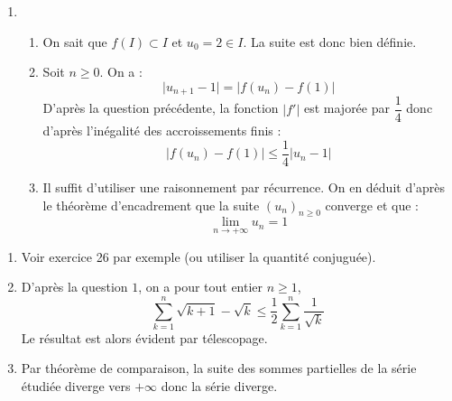 \documentclass[a4paper,twoside,french,11pt]{VcCours}
\begin{document}
\begin{enumerate}
\begin{enumerate}
\end{enumerate}
\item 
\begin{enumerate}
\item On sait que $f(I) \subset I$ et $u_0 = 2 \in I$. La suite est donc bien définie.
\item Soit $n \geq 0$. On a :
$$ \vert u_{n+1} - 1 \vert = \vert f(u_n)- f(1) \vert $$
D'après la question précédente, la fonction $\vert f' \vert$ est majorée par $\dfrac{1}{4}$ donc d'après l'inégalité des accroissements finis : 
$$  \vert f(u_n)- f(1) \vert  \leq \dfrac{1}{4} \vert u_n - 1 \vert$$
\item Il suffit d'utiliser une raisonnement par récurrence. On en déduit d'après le théorème d'encadrement que la suite $(u_n)_{n \geq 0}$ converge et que :
$$ \lim_{n \rightarrow + \infty} u_n = 1$$
\end{enumerate}
\end{enumerate}



\begin{Exercice}{}\end{Exercice}
\begin{enumerate}
\item Voir exercice 26 par exemple (ou utiliser la quantité conjuguée).
\item D'après la question $1$, on a pour tout entier $n \geq 1$,
$$ \sum_{k=1}^n \sqrt{k+1} - \sqrt{k} \leq \dfrac{1}{2} \sum_{k=1}^n \dfrac{1}{\sqrt{k}}$$
Le résultat est alors évident par télescopage.
\item Par théorème de comparaison, la suite des sommes partielles de la série étudiée diverge vers $+ \infty$ donc la série diverge.
\end{enumerate}
\end{document}
